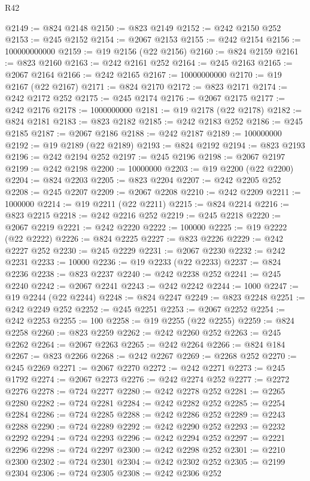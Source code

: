 \begin{lexlean}{R42}
\begin{coremodule}
{@2149 := @824 @2148
@2150 := @823 @2149
@2152 := @242 @2150 @252
@2153 := @245 @2152
@2154 := @2067 @2153
@2155 := @242 @2154
@2156 := 100000000000
@2159 := @19 @2156 (@22 @2156)
@2160 := @824 @2159
@2161 := @823 @2160
@2163 := @242 @2161 @252
@2164 := @245 @2163
@2165 := @2067 @2164
@2166 := @242 @2165
@2167 := 10000000000
@2170 := @19 @2167 (@22 @2167)
@2171 := @824 @2170
@2172 := @823 @2171
@2174 := @242 @2172 @252
@2175 := @245 @2174
@2176 := @2067 @2175
@2177 := @242 @2176
@2178 := 1000000000
@2181 := @19 @2178 (@22 @2178)
@2182 := @824 @2181
@2183 := @823 @2182
@2185 := @242 @2183 @252
@2186 := @245 @2185
@2187 := @2067 @2186
@2188 := @242 @2187
@2189 := 100000000
@2192 := @19 @2189 (@22 @2189)
@2193 := @824 @2192
@2194 := @823 @2193
@2196 := @242 @2194 @252
@2197 := @245 @2196
@2198 := @2067 @2197
@2199 := @242 @2198
@2200 := 10000000
@2203 := @19 @2200 (@22 @2200)
@2204 := @824 @2203
@2205 := @823 @2204
@2207 := @242 @2205 @252
@2208 := @245 @2207
@2209 := @2067 @2208
@2210 := @242 @2209
@2211 := 1000000
@2214 := @19 @2211 (@22 @2211)
@2215 := @824 @2214
@2216 := @823 @2215
@2218 := @242 @2216 @252
@2219 := @245 @2218
@2220 := @2067 @2219
@2221 := @242 @2220
@2222 := 100000
@2225 := @19 @2222 (@22 @2222)
@2226 := @824 @2225
@2227 := @823 @2226
@2229 := @242 @2227 @252
@2230 := @245 @2229
@2231 := @2067 @2230
@2232 := @242 @2231
@2233 := 10000
@2236 := @19 @2233 (@22 @2233)
@2237 := @824 @2236
@2238 := @823 @2237
@2240 := @242 @2238 @252
@2241 := @245 @2240
@2242 := @2067 @2241
@2243 := @242 @2242
@2244 := 1000
@2247 := @19 @2244 (@22 @2244)
@2248 := @824 @2247
@2249 := @823 @2248
@2251 := @242 @2249 @252
@2252 := @245 @2251
@2253 := @2067 @2252
@2254 := @242 @2253
@2255 := 100
@2258 := @19 @2255 (@22 @2255)
@2259 := @824 @2258
@2260 := @823 @2259
@2262 := @242 @2260 @252
@2263 := @245 @2262
@2264 := @2067 @2263
@2265 := @242 @2264
@2266 := @824 @184
@2267 := @823 @2266
@2268 := @242 @2267
@2269 := @2268 @252
@2270 := @245 @2269
@2271 := @2067 @2270
@2272 := @242 @2271
@2273 := @245 @1792
@2274 := @2067 @2273
@2276 := @242 @2274 @252
@2277 := @2272 @2276
@2278 := @724 @2277
@2280 := @242 @2278 @252
@2281 := @2265 @2280
@2282 := @724 @2281
@2284 := @242 @2282 @252
@2285 := @2254 @2284
@2286 := @724 @2285
@2288 := @242 @2286 @252
@2289 := @2243 @2288
@2290 := @724 @2289
@2292 := @242 @2290 @252
@2293 := @2232 @2292
@2294 := @724 @2293
@2296 := @242 @2294 @252
@2297 := @2221 @2296
@2298 := @724 @2297
@2300 := @242 @2298 @252
@2301 := @2210 @2300
@2302 := @724 @2301
@2304 := @242 @2302 @252
@2305 := @2199 @2304
@2306 := @724 @2305
@2308 := @242 @2306 @252
}
\end{coremodule}
\end{lexlean}
